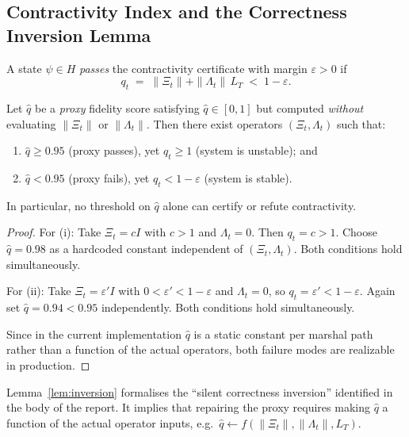 \documentclass[11pt]{article}
\begin{document}
\subsection{Contractivity Index and the Correctness Inversion Lemma}
\label{sec:qt}

\begin{definition}
\label{def:cert}
A state $\psi\in H$ \emph{passes} the contractivity certificate
with margin $\varepsilon>0$ if
\[
q_{t} \;=\; \|\Xi_{t}\| + \|\Lambda_{t}\|\,L_{T} \;<\; 1-\varepsilon.
\]
\end{definition}

\begin{lemma}
\label{lem:inversion}
Let $\hat{q}$ be a \emph{proxy} fidelity score satisfying
$\hat{q}\in[0,1]$ but computed \emph{without} evaluating
$\|\Xi_{t}\|$ or $\|\Lambda_{t}\|$.
Then there exist operators $(\Xi_{t},\Lambda_{t})$ such that:
\begin{enumerate}[label=(\roman*)]
\item $\hat{q}\geq 0.95$ (proxy passes), yet $q_{t}\geq 1$ (system is unstable); and
\item $\hat{q}<0.95$ (proxy fails), yet $q_{t}<1-\varepsilon$ (system is stable).
\end{enumerate}
In particular, no threshold on $\hat{q}$ alone can certify
or refute contractivity.
\end{lemma}

\begin{proof}
For (i): Take $\Xi_{t}=c I$ with $c>1$ and $\Lambda_{t}=0$.
Then $q_{t}=c>1$.
Choose $\hat{q}=0.98$ as a hardcoded constant
independent of $(\Xi_{t},\Lambda_{t})$.
Both conditions hold simultaneously.

For (ii): Take $\Xi_{t}=\varepsilon' I$ with $0<\varepsilon'<1-\varepsilon$
and $\Lambda_{t}=0$, so $q_{t}=\varepsilon'<1-\varepsilon$.
Again set $\hat{q}=0.94<0.95$ independently.
Both conditions hold simultaneously.

Since in the current implementation
$\hat{q}$ is a static constant per marshal path
rather than a function of the actual operators,
both failure modes are realizable in production.
\end{proof}

\begin{remark}
Lemma~\ref{lem:inversion} formalises the ``silent correctness inversion''
identified in the body of the report.
It implies that repairing the proxy requires making
$\hat{q}$ a function of the actual operator inputs,
e.g.\ $\hat{q}\leftarrow f(\|\Xi_{t}\|,\|\Lambda_{t}\|,L_{T})$.
\end{remark}
\end{document}
